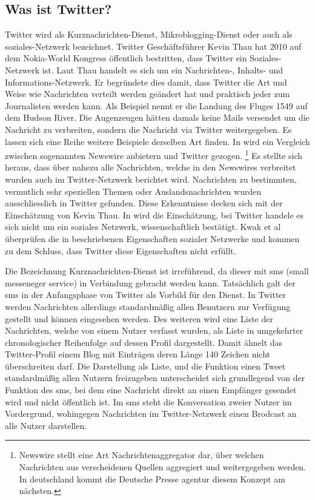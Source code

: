 		\subsection{Was ist Twitter?}
		Twitter wird als Kurznachrichten-Dienst, Mikroblogging-Dienst oder auch als soziales-Netzwerk bezeichnet. 
		Twitter Geschäftsführer Kevin Thau hat 2010 auf dem Nokia-World Kongress öffentlich bestritten, dass Twitter ein Soziales-Netzwerk ist. 
		Laut Thau handelt es sich um ein Nachrichten-, Inhalts- und Informations-Netzwerk. 
		Er begründete dies damit, dass Twitter die Art und Weise wie Nachrichten verteilt werden geändert hat und praktisch jeder zum Journalisten werden kann. 
		Als Beispiel nennt er die Landung des Fluges 1549 auf dem Hudson River. 
		Die Augenzeugen hätten damals keine Mails versendet um die Nachricht zu verbreiten, sondern die Nachricht via Twitter weitergegeben.
		Es lassen sich eine Reihe weitere Beispiele derselben Art finden. 
		In \cite{Petrovic2013} wird ein Vergleich zwischen sogenannten Newswire anbietern und Twitter gezogen. \footnote{Newswire stellt eine Art Nachrichtenaggregator dar, über welchen Nachrichten aus verscheidenen Quellen aggregiert und weitergegeben werden. In deutschland kommt die Deutsche Presse agentur diesem Konzept am nächsten.}
		Es stellte sich heraus, dass über nahezu alle Nachrichten, welche in den Newswires verbreitet wurden auch im Twitter-Netzwerk berichtet wird.
		Nachrichten zu bestimmten, vermutlich sehr speziellen Themen oder Auslandsnachrichten wurden ausschliesslich in Twitter gefunden. 
		Diese Erkenntnisse decken sich mit der Einschätzung von Kevin Thau. 
		In \cite{Kwak2010} wird die Einschätzung, bei Twitter handele es sich nicht um ein soziales Netzwerk, wissenschaftlich bestätigt.
		Kwak et al überprüfen die in \cite{Newman2003} beschriebenen Eigenschaften sozialer Netzwerke und kommen zu dem Schluss, dass Twitter diese Eigenschaften nicht erfüllt.	

		Die Bezeichnung Kurznachrichten-Dienst ist irreführend, da dieser mit sms (small messeneger service) in Verbindung gebracht werden kann. 
		Tatsächlich galt der sms in der Anfangsphase von Twitter als Vorbild für den Dienst.
		In Twitter werden Nachrichten allerdings standardmäßig allen Benutzern zur Verfügung gestellt und können eingesehen werden. 
		Des weiteren wird eine Liste der Nachrichten, welche von einem Nutzer verfasst wurden, als Liste in umgekehrter chronologischer Reihenfolge auf dessen Profil dargestellt.
		Damit ähnelt das Twitter-Profil einem Blog mit Einträgen deren Länge 140 Zeichen nicht überschreiten darf. 
		Die Darstellung als Liste, und die Funktion einen Tweet standardmäßig allen Nutzern freizugeben unterscheidet sich grundlegend von der Funktion des sms, bei dem eine Nachricht direkt an einen Empfänger gesendet wird und nicht öffentlich ist.
		Im sms steht die Konversation zweier Nutzer im Vordergrund, wohingegen Nachrichten im Twitter-Netzwerk einen Brodcast an alle Nutzer darstellen.

